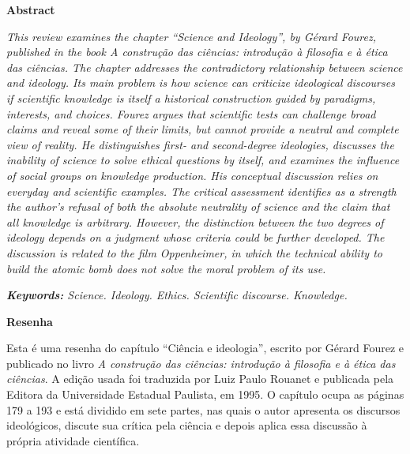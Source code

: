 \documentclass[12pt,a4paper]{article}
\begin{document}
\noindent\textbf{Abstract}\par
\noindent\setlength{\parindent}{0pt}%
\textit{This review examines the chapter ``Science and Ideology'', by Gérard Fourez, published in the book A construção das ciências: introdução à filosofia e à ética das ciências. The chapter addresses the contradictory relationship between science and ideology. Its main problem is how science can criticize ideological discourses if scientific knowledge is itself a historical construction guided by paradigms, interests, and choices. Fourez argues that scientific tests can challenge broad claims and reveal some of their limits, but cannot provide a neutral and complete view of reality. He distinguishes first- and second-degree ideologies, discusses the inability of science to solve ethical questions by itself, and examines the influence of social groups on knowledge production. His conceptual discussion relies on everyday and scientific examples. The critical assessment identifies as a strength the author's refusal of both the absolute neutrality of science and the claim that all knowledge is arbitrary. However, the distinction between the two degrees of ideology depends on a judgment whose criteria could be further developed. The discussion is related to the film Oppenheimer, in which the technical ability to build the atomic bomb does not solve the moral problem of its use.}

\vspace{6pt}
\noindent\textit{\textbf{Keywords:} Science. Ideology. Ethics. Scientific discourse. Knowledge.}
\setlength{\parindent}{1.25cm}

\vspace{18pt}

\begin{center}
\textbf{\large Resenha}
\end{center}
\vspace{6pt}

Esta é uma resenha do capítulo ``Ciência e ideologia'', escrito por Gérard Fourez e publicado no livro \textit{A construção das ciências: introdução à filosofia e à ética das ciências}. A edição usada foi traduzida por Luiz Paulo Rouanet e publicada pela Editora da Universidade Estadual Paulista, em 1995. O capítulo ocupa as páginas 179 a 193 e está dividido em sete partes, nas quais o autor apresenta os discursos ideológicos, discute sua crítica pela ciência e depois aplica essa discussão à própria atividade científica.
\end{document}
